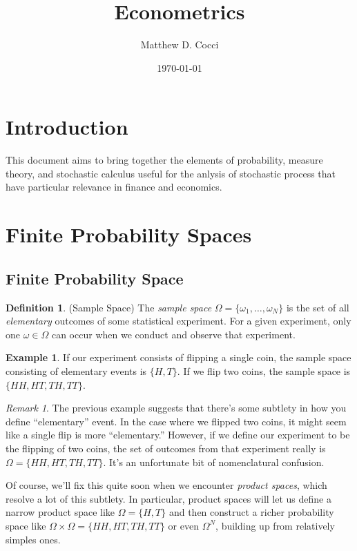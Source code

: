 \documentclass[12pt]{article}
\author{Matthew D. Cocci}
\title{Econometrics}
\date{\today}
\theoremstyle{plain}
\theoremstyle{definition}
\newtheorem{defn}[thm]{Definition}
\newtheorem{ex}[thm]{Example}
\theoremstyle{remark}
\newtheorem*{rmk}{Remark}
\begin{document}
\maketitle
\tableofcontents %

\clearpage

\section{Introduction}

This document aims to bring together the elements of probability,
measure theory, and stochastic calculus useful for the anlysis of
stochastic process that have particular relevance in finance and
economics.

\section{Finite Probability Spaces}

\subsection{Finite Probability Space}

\begin{defn}{(Sample Space)}
The \emph{sample space} $\Omega=\{\omega_1,\ldots,\omega_N\}$ is the set
of all \emph{elementary} outcomes of some statistical experiment. For a
given experiment, only one $\omega \in \Omega$ can occur when we conduct
and observe that experiment.
\end{defn}
\begin{ex}
If our experiment consists of flipping a single coin, the sample space
consisting of elementary events is $\{H,T\}$. If we flip two coins, the
sample space is $\{HH,HT,TH,TT\}$.
\end{ex}
\begin{rmk}
The previous example suggests that there's some subtlety in how you
define ``elementary'' event. In the case where we flipped two coins, it
might seem like a single flip is more ``elementary.'' However, if we define
our experiment to be the flipping of two coins, the set of outcomes from
that experiment really is $\Omega=\{HH,HT,TH,TT\}$. It's an unfortunate
bit of nomenclatural confusion.

Of course, we'll fix this quite soon when we encounter \emph{product
spaces}, which resolve a lot of this subtlety. In particular, product
spaces will let us define a narrow product space like $\Omega=\{H,T\}$
and then construct a richer probability space like
$\Omega\times \Omega = \{HH,HT,TH,TT\}$ or even $\Omega^N$, building up
from relatively simples ones.
\end{rmk}
\end{document}
